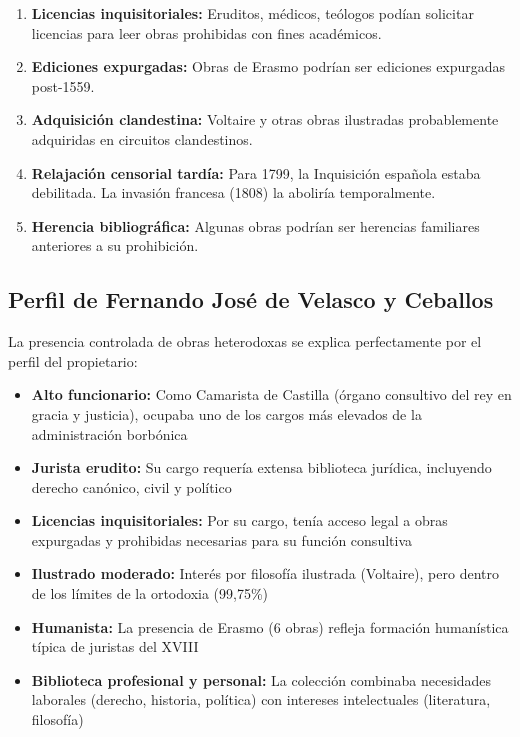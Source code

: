 \documentclass[12pt,a4paper]{article}
\begin{document}
\begin{enumerate}
    \item \textbf{Licencias inquisitoriales:} Eruditos, médicos, teólogos podían solicitar licencias para leer obras prohibidas con fines académicos.

    \item \textbf{Ediciones expurgadas:} Obras de Erasmo podrían ser ediciones expurgadas post-1559.

    \item \textbf{Adquisición clandestina:} Voltaire y otras obras ilustradas probablemente adquiridas en circuitos clandestinos.

    \item \textbf{Relajación censorial tardía:} Para 1799, la Inquisición española estaba debilitada. La invasión francesa (1808) la aboliría temporalmente.

    \item \textbf{Herencia bibliográfica:} Algunas obras podrían ser herencias familiares anteriores a su prohibición.
\end{enumerate}

\subsection{Perfil de Fernando José de Velasco y Ceballos}

La presencia controlada de obras heterodoxas se explica perfectamente por el perfil del propietario:

\begin{itemize}
    \item \textbf{Alto funcionario:} Como Camarista de Castilla (órgano consultivo del rey en gracia y justicia), ocupaba uno de los cargos más elevados de la administración borbónica
    \item \textbf{Jurista erudito:} Su cargo requería extensa biblioteca jurídica, incluyendo derecho canónico, civil y político
    \item \textbf{Licencias inquisitoriales:} Por su cargo, tenía acceso legal a obras expurgadas y prohibidas necesarias para su función consultiva
    \item \textbf{Ilustrado moderado:} Interés por filosofía ilustrada (Voltaire), pero dentro de los límites de la ortodoxia (99,75\%)
    \item \textbf{Humanista:} La presencia de Erasmo (6 obras) refleja formación humanística típica de juristas del XVIII
    \item \textbf{Biblioteca profesional y personal:} La colección combinaba necesidades laborales (derecho, historia, política) con intereses intelectuales (literatura, filosofía)
\end{itemize}
\end{document}

